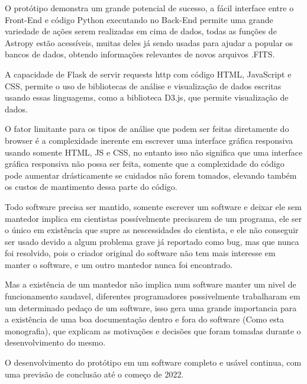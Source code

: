 O protótipo demonstra um grande potencial de sucesso, a fácil interface entre o Front-End e código Python executando no Back-End permite uma grande variedade de ações serem realizadas em cima de dados, todas as funções de Astropy estão acessíveis, muitas deles já sendo usadas para ajudar a popular os bancos de dados, obtendo informações relevantes de novos arquivos .FITS.

A capacidade de Flask de servir requests http com código HTML, JavaScript e CSS, permite o uso de bibliotecas de análise e visualização de dados escritas usando essas linguagems, como a biblioteca D3.js, que permite visualização de dados.

O fator limitante para os tipos de análise que podem ser feitas diretamente do browser é a complexidade inerente em escrever uma interface gráfica responsiva usando somente HTML, JS e CSS, no entanto isso não significa que uma interface gráfica responsiva não possa ser feita, somente que a complexidade do código pode aumentar drásticamente se cuidados não forem tomados, elevando também os custos de mantimento dessa parte do código.

Todo software precisa ser mantido, somente escrever um software e deixar ele sem mantedor implica em cientistas possívelmente precisarem de um programa, ele ser o único em existência que supre as nescessidades do cientista, e ele não conseguir ser usado devido a algum problema grave já reportado como bug, mas que nunca foi resolvido, pois o criador original do software não tem mais interesse em manter o software, e um outro mantedor nunca foi encontrado.

Mas a existência de um mantedor não implica num software manter um nivel de funcionamento saudavel, diferentes programadores possivelmente trabalharam em um determinado pedaço de um software, isso gera uma grande importancia para a existência de uma boa documentação dentro e fora do software (Como esta monografia), que explicam as motivações e decisões que foram tomadas durante o desenvolvimento do mesmo.

O desenvolvimento do protótipo em um software completo e usável continua, com uma previsão de conclusão até o começo de 2022.